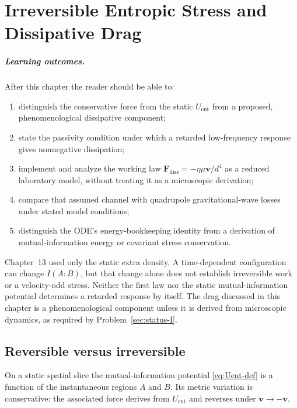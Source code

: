 \chapter[Dissipative drag]{Irreversible Entropic Stress and Dissipative Drag}
\label{ch:dissipation}

\paragraph{Learning outcomes.}
After this chapter the reader should be able to:
\begin{enumerate}
  \item distinguish the conservative force from the static
        \(U_{\mathrm{ent}}\) from a proposed, phenomenological
        dissipative component;
  \item state the passivity condition under which a retarded
        low-frequency response gives nonnegative dissipation;
  \item implement and analyze the working law
        \(\mathbf{F}_{\mathrm{diss}}=-\eta\mu\mathbf{v}/d^4\)
        as a reduced laboratory model, without treating it as a
        microscopic derivation;
  \item compare that assumed channel with quadrupole
        gravitational-wave losses under stated model conditions;
  \item distinguish the ODE's energy-bookkeeping identity from a
        derivation of mutual-information energy or covariant stress
        conservation.
\end{enumerate}

Chapter~13 used only the static extra density. A time-dependent
configuration can change \(I(A:B)\), but that change alone does not
establish irreversible work or a velocity-odd stress. Neither the
first law nor the static mutual-information potential determines a
retarded response by itself. The drag discussed in this chapter is
a phenomenological component unless it is derived from microscopic
dynamics, as required by Problem~\ref{sec:status-I}.

\section{Reversible versus irreversible}
\label{sec:ch14-split}

On a static spatial slice the mutual-information potential
\eqref{eq:Uent-def} is a function of the instantaneous regions
\(A\) and \(B\). Its metric variation is conservative: the
associated force derives from \(U_{\mathrm{ent}}\) and reverses
under \(\mathbf{v}\to-\mathbf{v}\).

